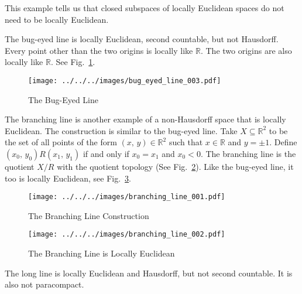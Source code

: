 \documentclass{article}
\theoremstyle{plain}
\theoremstyle{normal}
\newenvironment{example}{%
    \pushQED{\qed}\renewcommand{\qedsymbol}{$\blacksquare$}\examplex%
}{%
    \popQED\endexamplex%
}
\begin{document}
        This example tells us that closed subspaces of locally Euclidean spaces
        do not need to be locally Euclidean.
        \begin{example}
            The bug-eyed line is locally Euclidean, second countable, but not
            Hausdorff. Every point other than the two origins is locally like
            $\mathbb{R}$. The two origins are also locally like $\mathbb{R}$.
            See Fig.~\ref{fig:bug_eyed_line}.
        \end{example}
        \begin{figure}
            \centering
            \texttt{[image: ../../../images/bug\_eyed\_line\_003.pdf]}
            \caption{The Bug-Eyed Line}
            \label{fig:bug_eyed_line}
        \end{figure}
        \begin{example}
            The branching line is another example of a non-Hausdorff space that
            is locally Euclidean. The construction is similar to the bug-eyed
            line. Take $X\subseteq\mathbb{R}^{2}$ to be the set of all points
            of the form $(x,\,y)\in\mathbb{R}^{2}$ such that $x\in\mathbb{R}$
            and $y=\pm{1}$. Define $(x_{0},\,y_{0})R(x_{1},\,y_{1})$ if and
            only if $x_{0}=x_{1}$ and $x_{0}<0$. The branching line is the
            quotient $X/R$ with the quotient topology
            (See Fig.~\ref{fig:branching_line_001}). Like the bug-eyed line,
            it too is locally Euclidean, see Fig.~\ref{fig:branching_line_002}.
        \end{example}
        \begin{figure}
            \centering
            \texttt{[image: ../../../images/branching\_line\_001.pdf]}
            \caption{The Branching Line Construction}
            \label{fig:branching_line_001}
        \end{figure}
        \begin{figure}
            \centering
            \texttt{[image: ../../../images/branching\_line\_002.pdf]}
            \caption{The Branching Line is Locally Euclidean}
            \label{fig:branching_line_002}
        \end{figure}
        \begin{example}
            The long line is locally Euclidean and Hausdorff, but not
            second countable. It is also not paracompact.
        \end{example}
\end{document}
